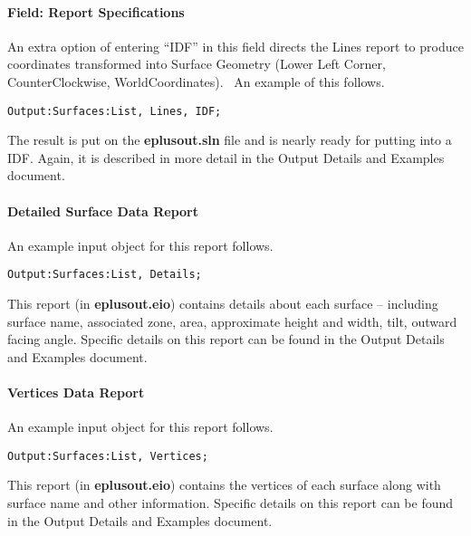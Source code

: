 \paragraph{Field: Report Specifications}\label{field-report-specifications}

An extra option of entering ``IDF'' in this field directs the Lines report to produce coordinates transformed into Surface Geometry (Lower Left Corner, CounterClockwise, WorldCoordinates).~ An example of this follows.

\begin{lstlisting}
Output:Surfaces:List, Lines, IDF;
\end{lstlisting}

The result is put on the \textbf{eplusout.sln} file and is nearly ready for putting into a IDF. Again, it is described in more detail in the Output Details and Examples document.

\paragraph{Detailed Surface Data Report}\label{detailed-surface-data-report}

An example input object for this report follows.

\begin{lstlisting}
Output:Surfaces:List, Details;
\end{lstlisting}

This report (in \textbf{eplusout.eio}) contains details about each surface -- including surface name, associated zone, area, approximate height and width, tilt, outward facing angle. Specific details on this report can be found in the Output Details and Examples document.

\paragraph{Vertices Data Report}\label{vertices-data-report}

An example input object for this report follows.

\begin{lstlisting}
Output:Surfaces:List, Vertices;
\end{lstlisting}

This report (in \textbf{eplusout.eio}) contains the vertices of each surface along with surface name and other information. Specific details on this report can be found in the Output Details and Examples document.

